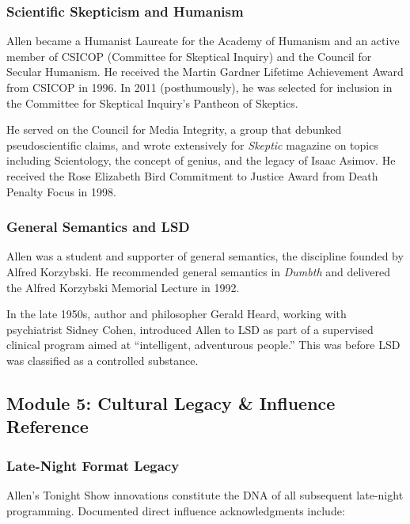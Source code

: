 \documentclass[11pt,letterpaper]{article}
\begin{document}
\subsubsection{Scientific Skepticism and Humanism}

Allen became a Humanist Laureate for the Academy of Humanism and an active member of CSICOP (Committee for Skeptical Inquiry) and the Council for Secular Humanism. He received the Martin Gardner Lifetime Achievement Award from CSICOP in 1996. In 2011 (posthumously), he was selected for inclusion in the Committee for Skeptical Inquiry's Pantheon of Skeptics.

He served on the Council for Media Integrity, a group that debunked pseudoscientific claims, and wrote extensively for \textit{Skeptic} magazine on topics including Scientology, the concept of genius, and the legacy of Isaac Asimov. He received the Rose Elizabeth Bird Commitment to Justice Award from Death Penalty Focus in 1998.

\subsubsection{General Semantics and LSD}

Allen was a student and supporter of general semantics, the discipline founded by Alfred Korzybski. He recommended general semantics in \textit{Dumbth} and delivered the Alfred Korzybski Memorial Lecture in 1992.

In the late 1950s, author and philosopher Gerald Heard, working with psychiatrist Sidney Cohen, introduced Allen to LSD as part of a supervised clinical program aimed at ``intelligent, adventurous people.'' This was before LSD was classified as a controlled substance.

\subsection{Module 5: Cultural Legacy \& Influence Reference}

\subsubsection{Late-Night Format Legacy}

Allen's Tonight Show innovations constitute the DNA of all subsequent late-night programming. Documented direct influence acknowledgments include:
\end{document}
